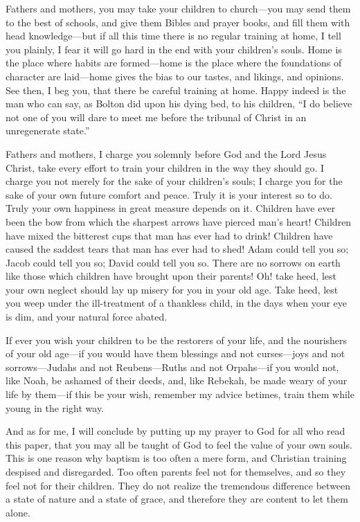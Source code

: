 \documentclass[
]{book}
\begin{document}
Fathers and mothers, you may take your children to church---you may send them to the best of schools, and give them Bibles and prayer books, and fill them with head knowledge---but if all this time there is no regular training at home, I tell you plainly, I fear it will go hard in the end with your children's souls. Home is the place where habits are formed---home is the place where the foundations of character are laid---home gives the bias to our tastes, and likings, and opinions. See then, I beg you, that there be careful training at home. Happy indeed is the man who can say, as Bolton did upon his dying bed, to his children, ``I do believe not one of you will dare to meet me before the tribunal of Christ in an unregenerate state.''

Fathers and mothers, I charge you solemnly before God and the Lord Jesus Christ, take every effort to train your children in the way they should go. I charge you not merely for the sake of your children's souls; I charge you for the sake of your own future comfort and peace. Truly it is your interest so to do. Truly your own happiness in great measure depends on it. Children have ever been the bow from which the sharpest arrows have pierced man's heart! Children have mixed the bitterest cups that man has ever had to drink! Children have caused the saddest tears that man has ever had to shed! Adam could tell you so; Jacob could tell you so; David could tell you so. There are no sorrows on earth like those which children have brought upon their parents! Oh! take heed, lest your own neglect should lay up misery for you in your old age. Take heed, lest you weep under the ill-treatment of a thankless child, in the days when your eye is dim, and your natural force abated.

If ever you wish your children to be the restorers of your life, and the nourishers of your old age---if you would have them blessings and not curses---joys and not sorrows---Judahs and not Reubens---Ruths and not Orpahs---if you would not, like Noah, be ashamed of their deeds, and, like Rebekah, be made weary of your life by them---if this be your wish, remember my advice betimes, train them while young in the right way.

And as for me, I will conclude by putting up my prayer to God for all who read this paper, that you may all be taught of God to feel the value of your own souls. This is one reason why baptism is too often a mere form, and Christian training despised and disregarded. Too often parents feel not for themselves, and so they feel not for their children. They do not realize the tremendous difference between a state of nature and a state of grace, and therefore they are content to let them alone.
\end{document}
